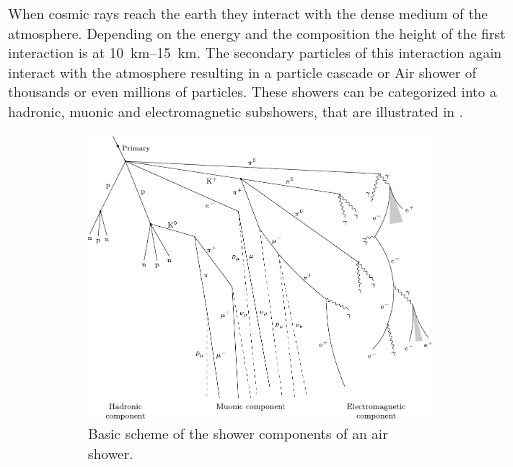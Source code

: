 When cosmic rays reach the earth they interact with the dense medium of the atmosphere.
Depending on the energy and the composition the height of the first interaction is at \SIrange{10}{15}{km}.
The secondary particles of this interaction again interact with the atmosphere resulting in a particle cascade or Air shower of thousands or even millions of particles.
These showers can be categorized into a hadronic, muonic and electromagnetic subshowers, that are illustrated in .

\begin{figure}
    \centering
    \begin{subfigure}[t]{0.47\textwidth}
        \centering
        \includegraphics[width=\textwidth]{./images/air_shower_components.pdf}
        \caption{Basic scheme of the shower components of an air shower. \cite{Barrantes18EAS}}
        \label{fig:air_shower_components}
    \end{subfigure}
    \hfill
    \begin{subfigure}[t]{0.47\textwidth}
        \centering

\end{subfigure}
\end{figure}
